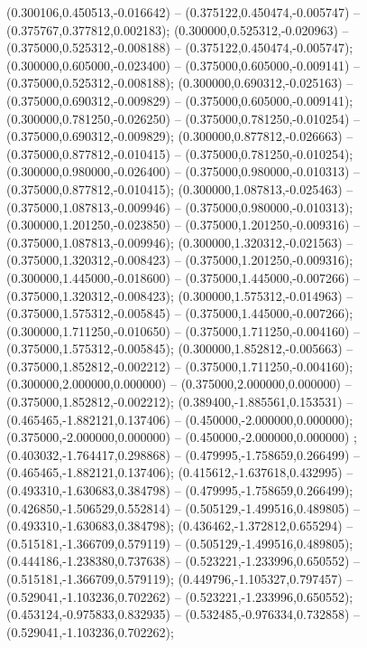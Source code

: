  (0.300106,0.450513,-0.016642) -- (0.375122,0.450474,-0.005747) -- (0.375767,0.377812,0.002183);
 (0.300000,0.525312,-0.020963) -- (0.375000,0.525312,-0.008188) -- (0.375122,0.450474,-0.005747);
 (0.300000,0.605000,-0.023400) -- (0.375000,0.605000,-0.009141) -- (0.375000,0.525312,-0.008188);
 (0.300000,0.690312,-0.025163) -- (0.375000,0.690312,-0.009829) -- (0.375000,0.605000,-0.009141);
 (0.300000,0.781250,-0.026250) -- (0.375000,0.781250,-0.010254) -- (0.375000,0.690312,-0.009829);
 (0.300000,0.877812,-0.026663) -- (0.375000,0.877812,-0.010415) -- (0.375000,0.781250,-0.010254);
 (0.300000,0.980000,-0.026400) -- (0.375000,0.980000,-0.010313) -- (0.375000,0.877812,-0.010415);
 (0.300000,1.087813,-0.025463) -- (0.375000,1.087813,-0.009946) -- (0.375000,0.980000,-0.010313);
 (0.300000,1.201250,-0.023850) -- (0.375000,1.201250,-0.009316) -- (0.375000,1.087813,-0.009946);
 (0.300000,1.320312,-0.021563) -- (0.375000,1.320312,-0.008423) -- (0.375000,1.201250,-0.009316);
 (0.300000,1.445000,-0.018600) -- (0.375000,1.445000,-0.007266) -- (0.375000,1.320312,-0.008423);
 (0.300000,1.575312,-0.014963) -- (0.375000,1.575312,-0.005845) -- (0.375000,1.445000,-0.007266);
 (0.300000,1.711250,-0.010650) -- (0.375000,1.711250,-0.004160) -- (0.375000,1.575312,-0.005845);
 (0.300000,1.852812,-0.005663) -- (0.375000,1.852812,-0.002212) -- (0.375000,1.711250,-0.004160);
 (0.300000,2.000000,0.000000) -- (0.375000,2.000000,0.000000) -- (0.375000,1.852812,-0.002212);
 (0.389400,-1.885561,0.153531) -- (0.465465,-1.882121,0.137406) -- (0.450000,-2.000000,0.000000);
 (0.375000,-2.000000,0.000000) -- (0.450000,-2.000000,0.000000) ;
 (0.403032,-1.764417,0.298868) -- (0.479995,-1.758659,0.266499) -- (0.465465,-1.882121,0.137406);
 (0.415612,-1.637618,0.432995) -- (0.493310,-1.630683,0.384798) -- (0.479995,-1.758659,0.266499);
 (0.426850,-1.506529,0.552814) -- (0.505129,-1.499516,0.489805) -- (0.493310,-1.630683,0.384798);
 (0.436462,-1.372812,0.655294) -- (0.515181,-1.366709,0.579119) -- (0.505129,-1.499516,0.489805);
 (0.444186,-1.238380,0.737638) -- (0.523221,-1.233996,0.650552) -- (0.515181,-1.366709,0.579119);
 (0.449796,-1.105327,0.797457) -- (0.529041,-1.103236,0.702262) -- (0.523221,-1.233996,0.650552);
 (0.453124,-0.975833,0.832935) -- (0.532485,-0.976334,0.732858) -- (0.529041,-1.103236,0.702262);
